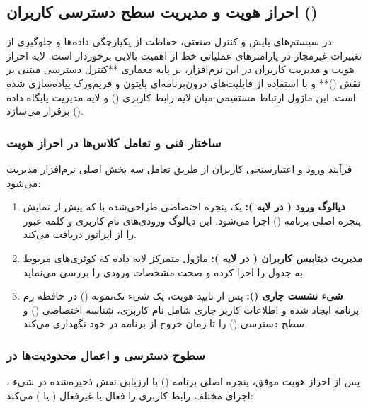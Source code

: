 \documentclass[a4paper, 10pt, twocolumn]{article}
\begin{document}
	\subsection{احراز هویت و مدیریت سطح دسترسی کاربران ()}
	
	در سیستم‌های پایش و کنترل صنعتی، حفاظت از یکپارچگی داده‌ها و جلوگیری از تغییرات غیرمجاز در پارامترهای عملیاتی خط از اهمیت بالایی برخوردار است. لایه احراز هویت و مدیریت کاربران در این نرم‌افزار، بر پایه معماری **کنترل دسترسی مبتنی بر نقش ()** و با استفاده از قابلیت‌های درون‌برنامه‌ای پایتون و فریم‌ورک  پیاده‌سازی شده است. این ماژول ارتباط مستقیمی میان لایه رابط کاربری () و لایه مدیریت پایگاه داده () برقرار می‌سازد.
	
	\subsubsection{ساختار فنی و تعامل کلاس‌ها در احراز هویت}
	فرآیند ورود و اعتبارسنجی کاربران از طریق تعامل سه بخش اصلی نرم‌افزار مدیریت می‌شود:
	\begin{enumerate}
		\item \textbf{دیالوگ ورود ( در لایه ):} یک پنجره اختصاصی طراحی‌شده با  که پیش از نمایش پنجره اصلی برنامه () اجرا می‌شود. این دیالوگ ورودی‌های نام کاربری و کلمه عبور را از اپراتور دریافت می‌کند.
		\item \textbf{مدیریت دیتابیس کاربران ( در لایه ):} ماژول متمرکز لایه داده که کوئری‌های مربوط به جدول  را اجرا کرده و صحت مشخصات ورودی را بررسی می‌نماید.
		\item \textbf{شیء نشست جاری ():} پس از تایید هویت، یک شیء تک‌نمونه () در حافظه رم برنامه ایجاد شده و اطلاعات کاربر جاری شامل نام کاربری، شناسه اختصاصی () و سطح دسترسی () را تا زمان خروج از برنامه در خود نگهداری می‌کند.
	\end{enumerate}
	
	\subsubsection{سطوح دسترسی و اعمال محدودیت‌ها در }
	پس از احراز هویت موفق، پنجره اصلی برنامه () با ارزیابی نقش ذخیره‌شده در شیء ، اجزای مختلف رابط کاربری را فعال یا غیرفعال ( یا ) می‌کند:
	
\end{document}
